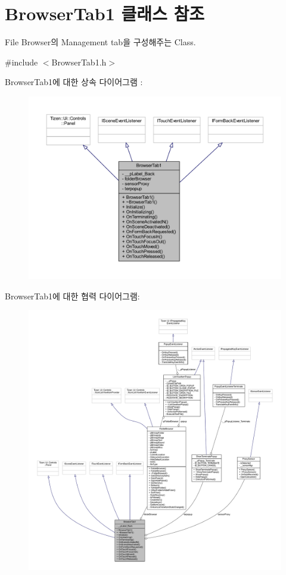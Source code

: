 \hypertarget{class_browser_tab1}{\section{Browser\+Tab1 클래스 참조}
\label{class_browser_tab1}
}


File Browser의 Management tab을 구성해주는 Class.  




{\ttfamily \#include $<$Browser\+Tab1.\+h$>$}



Browser\+Tab1에 대한 상속 다이어그램 \+: 
\nopagebreak
\begin{figure}[H]
\begin{center}
\leavevmode
\includegraphics[width=350pt]{class_browser_tab1__inherit__graph}
\end{center}
\end{figure}


Browser\+Tab1에 대한 협력 다이어그램\+:
\nopagebreak
\begin{figure}[H]
\begin{center}
\leavevmode
\includegraphics[width=350pt]{class_browser_tab1__coll__graph}
\end{center}
\end{figure}
